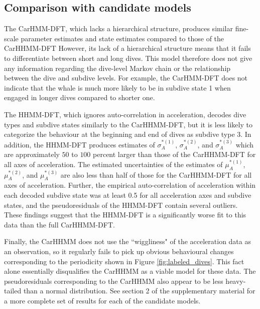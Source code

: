 \subsection{Comparison with candidate models}

The CarHMM-DFT, which lacks a hierarchical structure, produces similar fine-scale parameter estimates and state estimates compared to those of the CarHHMM-DFT However, its lack of a hierarchical structure means that it fails to differentiate between short and long dives. This model therefore does not give any information regarding the dive-level Markov chain or the relationship between the dive and subdive levels. For example, the CarHMM-DFT does not indicate that the whale is much more likely to be in subdive state 1 when engaged in longer dives compared to shorter one.

The HHMM-DFT, which ignores auto-correlation in acceleration, decodes dive types and subdive states similarly to the CarHHMM-DFT, but it is less likely to categorize the behaviour at the beginning and end of dives as subdive type 3. In addition, the HHMM-DFT produces estimates of $\sigma_A^{*(1)}$, $\sigma_A^{*(2)}$, and $\sigma_A^{*(3)}$ which are approximately $50$ to $100$ percent larger than those of the CarHHMM-DFT for all axes of acceleration. The estimated uncertainties of the estimates of $\mu_A^{*(1)}$, $\mu_A^{*(2)}$, and $\mu_A^{*(3)}$ are also less than half of those for the CarHHMM-DFT for all axes of acceleration. Further, the empirical auto-correlation of acceleration within each decoded subdive state was at least 0.5 for all acceleration axes and subdive states, and the pseudoresiduals of the HHMM-DFT contain several outliers. These findings suggest that the HHMM-DFT is a significantly worse fit to this data than the full CarHHMM-DFT.

Finally, the CarHHMM does not use the ``wiggliness" of the acceleration data as an observation, so it regularly fails to pick up obvious behavioural changes corresponding to the periodicity shown in Figure \ref{fig:labeled_dives}. This fact alone essentially disqualifies the CarHHMM as a viable model for these data. The pseudoresiduals corresponding to the CarHHMM also appear to be less heavy-tailed than a normal distribution. See section 2 of the supplementary material for a more complete set of results for each of the candidate models.